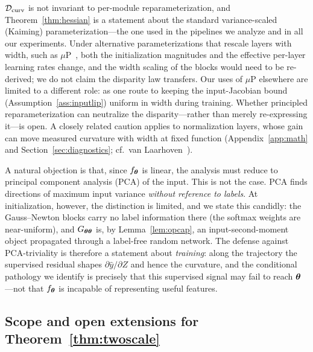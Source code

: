 \begin{remark}
\label{rem:param_scope}
$\mathcal{D}_{\mathrm{curv}}$ is not invariant to per-module reparameterization, and
Theorem~\ref{thm:hessian} is a statement about the standard variance-scaled
(Kaiming) parameterization---the one used in the pipelines we analyze and in
all our experiments. Under alternative parameterizations that rescale layers
with width, such as $\mu$P~\citep{yang2021tensor}, both the initialization
magnitudes and the effective per-layer learning rates change, and the width
scaling of the blocks would need to be re-derived; we do not claim the
disparity law transfers. Our uses of $\mu$P elsewhere are limited to a
different role: as one route to keeping the input-Jacobian bound
(Assumption~\ref{ass:inputlip}) uniform in width during training. Whether
principled reparameterization can neutralize the disparity---rather than
merely re-expressing it---is open. A closely related caution applies to
normalization layers, whose gain can move measured curvature with width at
fixed function (Appendix~\ref{app:math} and Section~\ref{sec:diagnostics};
cf.\ van Laarhoven~\citep{vanlaarhoven2017l2}).
\end{remark}

\begin{remark}
\label{rem:not_pca}
A natural objection is that, since $f_{\boldsymbol{\theta}}$ is linear, the analysis must
reduce to principal component analysis (PCA) of the input. This is not the
case. PCA finds directions of maximum input variance \emph{without reference
to labels}. At initialization, however, the distinction is limited, and we
state this candidly: the Gauss--Newton blocks carry no label information
there (the softmax weights are near-uniform), and $G_{{\boldsymbol{\theta}}{\boldsymbol{\theta}}}$ is,
by Lemma~\ref{lem:opcap}, an input-second-moment object propagated through a
label-free random network. The defense against PCA-triviality is therefore a
statement about \emph{training}: along the trajectory the supervised
residual shapes $\partial \hat{y}/\partial Z$ and hence the curvature, and
the conditional pathology we identify is precisely that this supervised
signal may fail to reach ${\boldsymbol{\theta}}$---not that $f_{\boldsymbol{\theta}}$ is incapable of
representing useful features.
\end{remark}

\subsection{Scope and open extensions for Theorem~\ref{thm:twoscale}}
\label{app:thm2_open}

